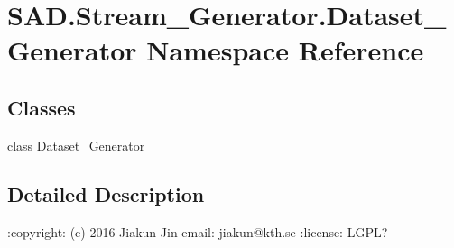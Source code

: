 \hypertarget{namespaceSAD_1_1Stream__Generator_1_1Dataset__Generator}{}\section{S\+A\+D.\+Stream\+\_\+\+Generator.\+Dataset\+\_\+\+Generator Namespace Reference}
\label{namespaceSAD_1_1Stream__Generator_1_1Dataset__Generator}
\subsection*{Classes}
\begin{DoxyCompactItemize}
\item 
class \hyperlink{classSAD_1_1Stream__Generator_1_1Dataset__Generator_1_1Dataset__Generator}{Dataset\+\_\+\+Generator}
\end{DoxyCompactItemize}


\subsection{Detailed Description}
\begin{DoxyVerb}:copyright: (c) 2016 Jiakun Jin
email: jiakun@kth.se
:license: LGPL?
\end{DoxyVerb}
 